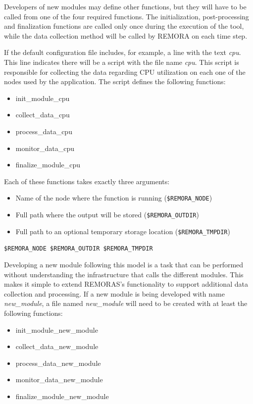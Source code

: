 \documentclass[10pt,a4paper]{report}
\begin{document}
Developers of new modules may define other functions,
but they will have to be called from one of the four required functions. The initialization,
post-processing and finalization functions are called only once during the execution of the
tool, while the data collection method will be called by REMORA on each time step.

If the default configuration file includes, for example, a line with the text \textit{cpu}.
This line indicates there will be a script with the file name \textit{cpu}. This script
is responsible for collecting the data regarding CPU utilization on each one of the
nodes used by the application. The script defines the following functions:

\begin{itemize}
	\item init\_module\_cpu
	\item collect\_data\_cpu
	\item process\_data\_cpu
	\item monitor\_data\_cpu
	\item finalize\_module\_cpu
\end{itemize}

Each of these functions takes exactly three arguments: 

\begin{itemize}
\item Name of the node where the function is running (\texttt{\$REMORA\_NODE})
\item Full path where the output will be stored (\texttt{\$REMORA\_OUTDIR})
\item Full path to an optional temporary storage location (\texttt{\$REMORA\_TMPDIR})
\end{itemize}

\verb+$REMORA_NODE $REMORA_OUTDIR $REMORA_TMPDIR+

Developing a new module following this model is a task that can be performed without understanding 
the infrastructure that calls the different modules.
This makes it simple to extend REMORAS's functionality to
support additional data collection and processing. If a new module is being developed with 
name \textit{new\_module}, a file named \textit{new\_module} will need to be created with at 
least the following functions:

\begin{itemize}
	\item init\_module\_new\_module
	\item collect\_data\_new\_module
	\item process\_data\_new\_module
	\item monitor\_data\_new\_module
	\item finalize\_module\_new\_module
\end{itemize}
\end{document}
